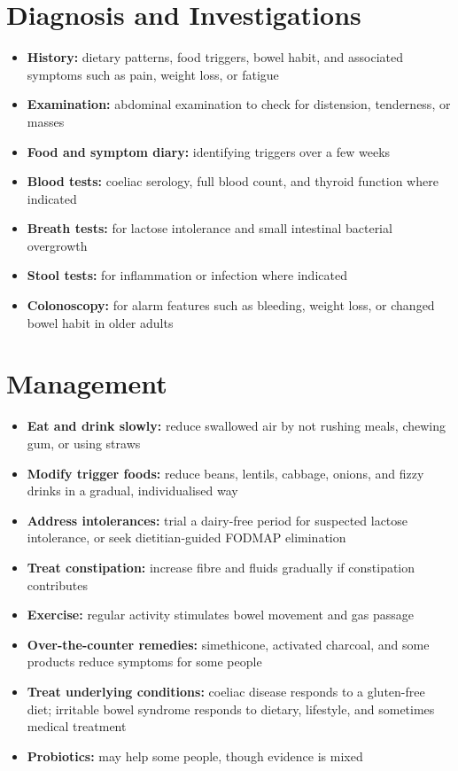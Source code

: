 \section*{Diagnosis and Investigations}
\begin{itemize}
    \item \textbf{History:} dietary patterns, food triggers, bowel habit, and associated symptoms such as pain, weight loss, or fatigue
    \item \textbf{Examination:} abdominal examination to check for distension, tenderness, or masses
    \item \textbf{Food and symptom diary:} identifying triggers over a few weeks
    \item \textbf{Blood tests:} coeliac serology, full blood count, and thyroid function where indicated
    \item \textbf{Breath tests:} for lactose intolerance and small intestinal bacterial overgrowth
    \item \textbf{Stool tests:} for inflammation or infection where indicated
    \item \textbf{Colonoscopy:} for alarm features such as bleeding, weight loss, or changed bowel habit in older adults
\end{itemize}

\section*{Management}
\begin{itemize}
    \item \textbf{Eat and drink slowly:} reduce swallowed air by not rushing meals, chewing gum, or using straws
    \item \textbf{Modify trigger foods:} reduce beans, lentils, cabbage, onions, and fizzy drinks in a gradual, individualised way
    \item \textbf{Address intolerances:} trial a dairy-free period for suspected lactose intolerance, or seek dietitian-guided FODMAP elimination
    \item \textbf{Treat constipation:} increase fibre and fluids gradually if constipation contributes
    \item \textbf{Exercise:} regular activity stimulates bowel movement and gas passage
    \item \textbf{Over-the-counter remedies:} simethicone, activated charcoal, and some products reduce symptoms for some people
    \item \textbf{Treat underlying conditions:} coeliac disease responds to a gluten-free diet; irritable bowel syndrome responds to dietary, lifestyle, and sometimes medical treatment
    \item \textbf{Probiotics:} may help some people, though evidence is mixed
\end{itemize}

